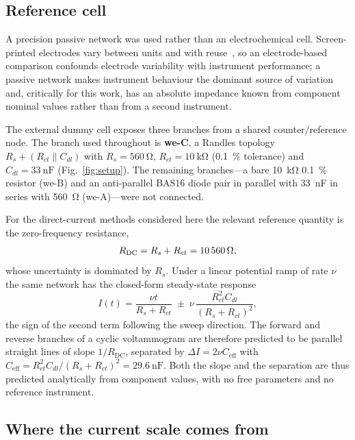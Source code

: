 \subsection{Reference cell}
\label{sec:cell}

A precision passive network was used rather than an electrochemical cell.
Screen-printed electrodes vary between units and with reuse~\cite{anshori2025ganestat,
finvsgar2018reusability}, so an electrode-based comparison confounds electrode
variability with instrument performance; a passive network makes instrument
behaviour the dominant source of variation~\cite{kasper2022electrochemical} and,
critically for this work, has an absolute impedance known from component nominal
values rather than from a second instrument.

The external dummy cell exposes three branches from a shared counter/reference
node. The branch used throughout is \textbf{we-C}, a Randles topology
$R_s + (R_{ct} \parallel C_{dl})$ with
$R_s = \SI{560}{\ohm}$,
$R_{ct} = \SI{10}{\kilo\ohm}$ (\SI{0.1}{\percent} tolerance) and
$C_{dl} = \SI{33}{\nano\farad}$
(Fig.~\ref{fig:setup}). The remaining branches---a bare \SI{10}{\kilo\ohm}
\SI{0.1}{\percent} resistor (we-B) and an anti-parallel BAS16 diode pair in
parallel with \SI{33}{\nano\farad} in series with \SI{560}{\ohm}
(we-A)---were not connected.

For the direct-current methods considered here the relevant reference quantity
is the zero-frequency resistance,
\begin{equation}
R_{\mathrm{DC}} = R_s + R_{ct} = \SI{10560}{\ohm},
\label{eq:rdc}
\end{equation}
whose uncertainty is dominated by $R_s$. Under a linear potential ramp of rate
$\nu$ the same network has the closed-form steady-state response
\begin{equation}
I(t) = \frac{\nu t}{R_s + R_{ct}}
     \;\pm\; \nu\,\frac{R_{ct}^{2} C_{dl}}{(R_s + R_{ct})^{2}},
\label{eq:ramp}
\end{equation}
the sign of the second term following the sweep direction. The forward and
reverse branches of a cyclic voltammogram are therefore predicted to be parallel
straight lines of slope $1/R_{\mathrm{DC}}$, separated by
$\Delta I = 2\nu C_{\mathrm{eff}}$ with
$C_{\mathrm{eff}} = R_{ct}^{2}C_{dl}/(R_s+R_{ct})^{2} = \SI{29.6}{\nano\farad}$.
Both the slope and the separation are thus predicted analytically from component
values, with no free parameters and no reference instrument.

\subsection{Where the current scale comes from}
\label{sec:traceability}


